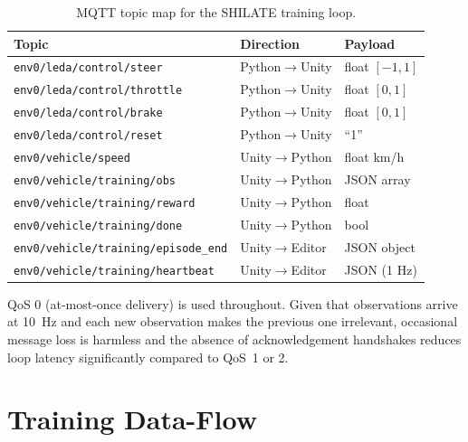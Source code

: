 \begin{table}[H]
\caption{MQTT topic map for the SHILATE training loop.}
\label{table:mqtt-topics}
\footnotesize
\begin{tabular}{|p{7.5cm}|p{3.2cm}|p{2.8cm}|}
  \hline
  \textbf{Topic} & \textbf{Direction} & \textbf{Payload} \\
  \hline
  \nolinkurl{env0/leda/control/steer}    & Python$\to$Unity & float $[-1,1]$ \\
  \hline
  \nolinkurl{env0/leda/control/throttle} & Python$\to$Unity & float $[0,1]$ \\
  \hline
  \nolinkurl{env0/leda/control/brake}    & Python$\to$Unity & float $[0,1]$ \\
  \hline
  \nolinkurl{env0/leda/control/reset}    & Python$\to$Unity & ``1'' \\
  \hline
  \nolinkurl{env0/vehicle/speed}         & Unity$\to$Python & float km/h \\
  \hline
  \nolinkurl{env0/vehicle/training/obs}  & Unity$\to$Python & JSON array \\
  \hline
  \nolinkurl{env0/vehicle/training/reward} & Unity$\to$Python & float \\
  \hline
  \nolinkurl{env0/vehicle/training/done} & Unity$\to$Python & bool \\
  \hline
  \nolinkurl{env0/vehicle/training/episode_end} & Unity$\to$Editor & JSON object \\
  \hline
  \nolinkurl{env0/vehicle/training/heartbeat}    & Unity$\to$Editor & JSON (1 Hz) \\
  \hline
\end{tabular}
\end{table}

QoS 0 (at-most-once delivery) is used throughout. Given that observations
arrive at 10~Hz and each new observation makes the previous one
irrelevant, occasional message loss is harmless and the absence of
acknowledgement handshakes reduces loop latency significantly compared to
QoS~1 or 2.

\section{Training Data-Flow}
\label{sec:dataflow}

